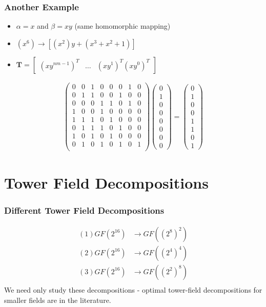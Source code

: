 \documentclass[handout]{beamer}
\begin{document}
\begin{frame}
\frametitle{Another Example}
\begin{itemize}
	\item $\alpha = x$ and $\beta = xy$ (same homomorphic mapping)
	\item $(x^6) \to [(x^2)y + (x^3 + x^2 + 1)]$
	\item $\textbf{T} =  \left[ \begin{array}{cccc}
(xy^{nm - 1})^T & \dots & (xy^{1})^T (xy^{0})^T \end{array} \right]$
\end{itemize}

\begin{align*}
\left( \begin{array}{cccccccc}
0 & 0 & 1 & 0 & 0 & 0 & 1 & 0 \\
0 & 1 & 1 & 0 & 0 & 1 & 0 & 0 \\
0 & 0 & 0 & 1 & 1 & 0 & 1 & 0 \\
1 & 0 & 0 & 1 & 0 & 0 & 0 & 0 \\
1 & 1 & 1 & 0 & 1 & 0 & 0 & 0 \\
0 & 1 & 1 & 1 & 0 & 1 & 0 & 0 \\
1 & 0 & 1 & 0 & 1 & 0 & 0 & 0 \\
0 & 1 & 0 & 1 & 0 & 1 & 0 & 1 \\ \end{array} \right) \left( \begin{array}{c}
0 \\
1 \\
0 \\ 
0 \\
0 \\ 
0 \\
0 \\ 
0 \end{array} \right) = \left( \begin{array}{c}
0 \\
1 \\
0 \\ 
0 \\
1 \\ 
1 \\
0 \\ 
1 \end{array} \right)
\end{align*}
\end{frame}

\section{Tower Field Decompositions}
\begin{frame}
	\frametitle{Different Tower Field Decompositions}
	\begin{align*}
	(1) GF(2^{16}) & \to GF((2^8)^2) \\ 
	(2) GF(2^{16}) & \to GF((2^4)^4) \\ 
	(3) GF(2^{16}) & \to GF((2^2)^8) \\
	\end{align*}
	We need only study these decompositions - optimal tower-field decompositions for smaller fields are in the literature.
\end{frame}
\end{document}
